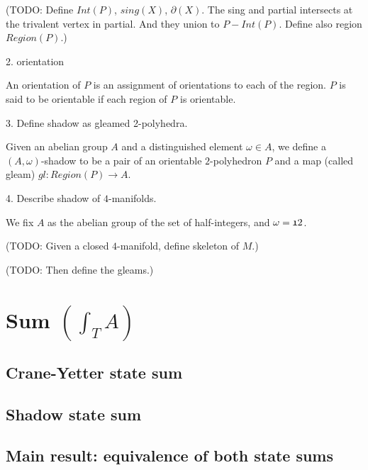 (TODO: Define $Int(P)$, $sing(X)$, $\partial(X)$. The sing and
partial intersects at the trivalent vertex in partial. And they
union to $P - Int(P)$. Define also region $Region(P)$.)

2. orientation

An orientation of $P$ is an assignment of orientations to each of
the region. $P$ is said to be orientable if each region of $P$ is
orientable.

3. Define shadow as gleamed 2-polyhedra.

Given an abelian group $A$ and a distinguished element
$\omega \in A$, we define a $(A,\omega)$-shadow to be a pair of
an orientable $2$-polyhedron $P$ and a map (called gleam)
$gl: Region(P) \to A$.

4. Describe shadow of $4$-manifolds.

We fix $A$ as the abelian group of the set of half-integers, and
$\omega = \frak{1}{2}$.

(TODO: Given a closed $4$-manifold, define skeleton of $M$.)

(TODO: Then define the gleams.)

\section{Sum $\left( \int_{T}{A} \right)$}
\subsection{Crane-Yetter state sum}
\subsection{Shadow state sum}
\subsection{Main result: equivalence of both state sums}
